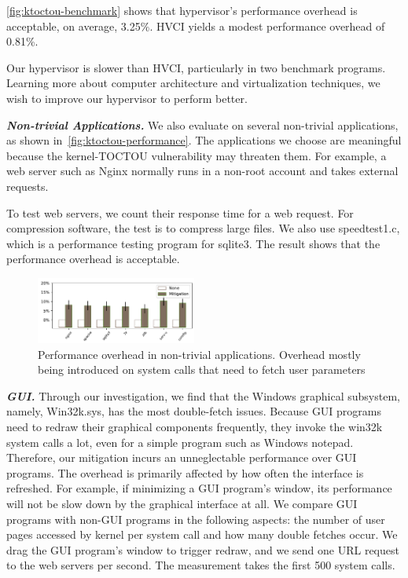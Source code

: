 \autoref{fig:ktoctou-benchmark} shows that hypervisor's performance overhead is acceptable, on average, 3.25\%. HVCI yields a modest performance overhead of 0.81\%.


Our hypervisor is slower than HVCI, particularly in two benchmark programs. Learning more about computer architecture and virtualization techniques, we wish to improve our hypervisor to perform better.



\textbf{\textit{Non-trivial Applications.}} We also evaluate \name on several non-trivial applications, as shown in~\autoref{fig:ktoctou-performance}. The applications we choose are meaningful because the kernel-TOCTOU vulnerability may threaten them. For example, a web server such as Nginx normally runs in a non-root account and takes external requests. 

To test web servers, we count their response time for a web request. For compression software, the test is to compress large files. We also use speedtest1.c, which is a performance testing program for sqlite3. The result shows that the performance overhead is acceptable. 

\begin{figure}[th]
  \includegraphics[width=0.47\textwidth]{figures/performance4}
  \centering
  \caption{Performance overhead in non-trivial applications. Overhead mostly being introduced on system calls that need to fetch user parameters}
  \label{fig:ktoctou-performance}
\end{figure}





\textbf{\textit{GUI.}} Through our investigation, we find that the Windows graphical subsystem, namely, Win32k.sys, has the most double-fetch issues.  Because GUI programs need to redraw their graphical components frequently, they invoke the win32k system calls a lot, even for a simple program such as Windows notepad. Therefore,  our mitigation incurs an unneglectable performance over GUI programs. The overhead is primarily affected by how often the interface is refreshed. For example, if minimizing a GUI program's window, its performance will not be slow down by the graphical interface at all. We compare GUI programs with non-GUI programs in the following aspects: the number of user pages accessed by kernel per system call and how many double fetches occur. We drag the GUI program's window to trigger redraw, and we send one URL request to the web servers per second. The measurement takes the first 500 system calls.

